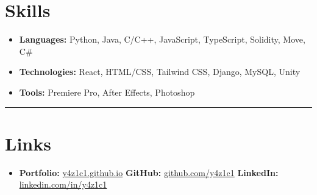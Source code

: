 \documentclass{article}
\begin{document}
\section*{Skills}
\vspace{-0.3em}
\begin{itemize}
    \item \textbf{Languages:} Python, Java, C/C++, JavaScript, TypeScript, Solidity, Move, C\#
    \item \textbf{Technologies:} React, HTML/CSS, Tailwind CSS, Django, MySQL, Unity
    \item \textbf{Tools:} Premiere Pro, After Effects, Photoshop
\end{itemize}
\hrule
\vspace{0.3em}
\section*{Links}
\vspace{-0.3em}
\begin{itemize}
    \item \textbf{Portfolio:} \href{https://y4z1c1.github.io}{y4z1c1.github.io} \quad \textbf{GitHub:} \href{https://github.com/y4z1c1}{github.com/y4z1c1} \quad \textbf{LinkedIn:} \href{https://www.linkedin.com/in/y4z1c1/}{linkedin.com/in/y4z1c1}
\end{itemize}
\end{document}
